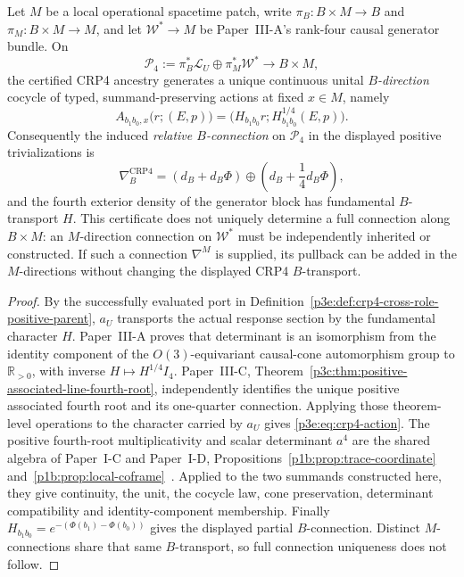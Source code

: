 \documentclass[12pt,a4paper]{article}
\begin{document}
\begin{theorem}
\label{p3e:thm:crp4-uniqueness}
Let \(M\) be a local operational spacetime patch, write
\(\pi_B:B\times M\to B\) and \(\pi_M:B\times M\to M\), and let
\(\mathscr W^*\to M\) be Paper~III-A's rank-four causal generator bundle.
On
\[
 \mathscr P_4
 :=\pi_B^*\mathcal L_U\oplus\pi_M^*\mathscr W^*
 \longrightarrow B\times M,
\]
the certified CRP4 ancestry generates a unique continuous unital
\emph{$B$-direction} cocycle of typed, summand-preserving actions at fixed
$x\in M$, namely
\begin{equation}
 \label{p3e:eq:crp4-action}
 A_{b_1b_0,x}\bigl(r;(E,p)\bigr)
 =\bigl(H_{b_1b_0}r;
        H_{b_1b_0}^{1/4}(E,p)\bigr).
\end{equation}
Consequently the induced \emph{relative $B$-connection} on
$\mathscr P_4$ in the displayed positive trivializations is
\[
 \nabla_B^{\mathrm{CRP4}}
 =\left(d_B+d_B\Phi\right)
  \oplus\left(d_B+\frac14d_B\Phi\right),
\]
and the fourth exterior density of the generator block has fundamental
$B$-transport $H$.  This certificate does not uniquely determine a full
connection along $B\times M$: an $M$-direction connection on
$\mathscr W^*$ must be independently inherited or constructed.  If such a
connection $\nabla^M$ is supplied, its pullback can be added in the
$M$-directions without changing the displayed CRP4 $B$-transport.
\end{theorem}

\begin{proof}
By the successfully evaluated port in
Definition~\ref{p3e:def:crp4-cross-role-positive-parent}, $a_U$
transports the actual response section by the fundamental character $H$.
Paper~III-A proves that determinant is an isomorphism from the identity
component of the \(O(3)\)-equivariant causal-cone automorphism group to
\(\mathbb R_{>0}\), with inverse \(H\mapsto H^{1/4}I_4\).  Paper~III-C,
Theorem~\ref{p3c:thm:positive-associated-line-fourth-root}, independently
identifies the unique positive associated fourth root and its one-quarter
connection.  Applying those theorem-level operations to the character carried
by \(a_U\) gives \eqref{p3e:eq:crp4-action}.  The positive fourth-root multiplicativity and scalar determinant
\(a^4\) are the shared algebra of Paper~I-C and Paper~I-D,
Propositions~\ref{p1b:prop:trace-coordinate}
and~\ref{p1b:prop:local-coframe}~\cite{Kugelmann2026Paper1C,Kugelmann2026Paper1D}.
Applied to the two summands constructed here, they give continuity,
the unit, the cocycle law, cone preservation, determinant compatibility
and identity-component membership.  Finally
\(H_{b_1b_0}=e^{-(\Phi(b_1)-\Phi(b_0))}\) gives the displayed
partial $B$-connection.  Distinct $M$-connections share that same
$B$-transport, so full connection uniqueness does not follow.
\end{proof}
\end{document}
